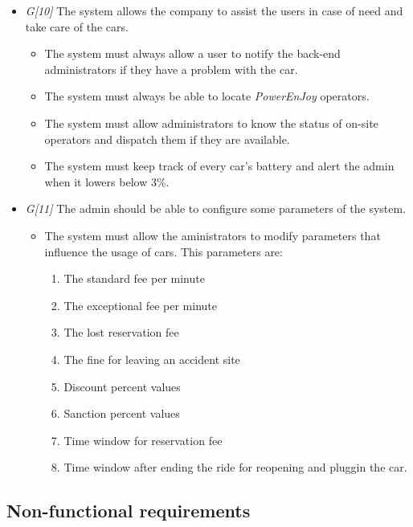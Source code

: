 \begin{itemize}
				\item \textit{G[10]} The system allows the company to assist the users in case of need and take care of the cars.	
					\begin{itemize}
						\item The system must always allow a user to notify the back-end administrators if they have a problem with the car.
						\item The system must always be able to locate \textit{PowerEnJoy} operators. 
						\item The system must allow administrators to know the status of on-site operators and dispatch them if they are available.
						\item The system must keep track of every car's battery and alert the admin when it lowers below 3\%. 
					\end{itemize}
					
				\item \textit{G[11]} The admin should be able to configure some parameters of the system.
					\begin{itemize}
						\item The system must allow the aministrators to modify parameters that influence the usage of cars. This parameters are:
							\begin{enumerate}
								\item The standard fee per minute
								\item The exceptional fee per minute
								\item The lost reservation fee
								\item The fine for leaving an accident site %
								\item Discount percent values
								\item Sanction percent values
								\item Time window for reservation fee
								\item Time window after ending the ride for reopening and pluggin the car.
							\end{enumerate}
					\end{itemize}
\end{itemize}





\subsection{Non-functional requirements}
